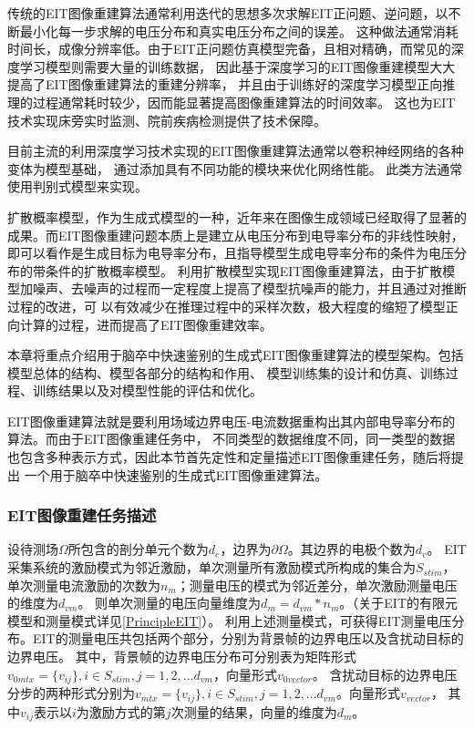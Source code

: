 
传统的EIT图像重建算法通常利用迭代的思想多次求解EIT正问题、逆问题，以不断最小化每一步求解的电压分布和真实电压分布之间的误差。
这种做法通常消耗时间长，成像分辨率低。由于EIT正问题仿真模型完备，且相对精确，而常见的深度学习模型则需要大量的训练数据，
因此基于深度学习的EIT图像重建模型大大提高了EIT图像重建算法的重建分辨率，
并且由于训练好的深度学习模型正向推理的过程通常耗时较少，因而能显著提高图像重建算法的时间效率。
这也为EIT技术实现床旁实时监测、院前疾病检测提供了技术保障。

目前主流的利用深度学习技术实现的EIT图像重建算法通常以卷积神经网络的各种变体为模型基础，
通过添加具有不同功能的模块来优化网络性能。
此类方法通常使用判别式模型来实现。

扩散概率模型，作为生成式模型的一种，近年来在图像生成领域已经取得了显著的成果。而EIT图像重建问题本质上是建立从电压分布到电导率分布的非线性映射，
即可以看作是生成目标为电导率分布，且指导模型生成电导率分布的条件为电压分布的带条件的扩散概率模型。
利用扩散模型实现EIT图像重建算法，由于扩散模型加噪声、去噪声的过程而一定程度上提高了模型抗噪声的能力，并且通过对推断过程的改进，可
以有效减少在推理过程中的采样次数，极大程度的缩短了模型正向计算的过程，进而提高了EIT图像重建效率。

本章将重点介绍用于脑卒中快速鉴别的生成式EIT图像重建算法的模型架构。包括模型总体的结构、模型各部分的结构和作用、
模型训练集的设计和仿真、训练过程、训练结果以及对模型性能的评估和优化。


\label{section:Model}

EIT图像重建算法就是要利用场域边界电压-电流数据重构出其内部电导率分布的算法。而由于EIT图像重建任务中，
不同类型的数据维度不同，同一类型的数据也包含多种表示方式，因此本节首先定性和定量描述EIT图像重建任务，随后将提出
一个用于脑卒中快速鉴别的生成式EIT图像重建算法。

\subsubsection{EIT图像重建任务描述}

设待测场$\Omega$所包含的剖分单元个数为$d_e$，边界为$\partial \Omega$。其边界的电极个数为$d_v$。
EIT采集系统的激励模式为邻近激励，单次测量所有激励模式所构成的集合为$S_{stim}$，单次测量电流激励的次数为$n_m$；测量电压的模式为邻近差分，单次激励测量电压的维度为$d_{vm}$。
则单次测量的电压向量维度为$d_m = d_{vm} * n_m$。（关于EIT的有限元模型和测量模式详见\cref{PrincipleEIT}）。
利用上述测量模式，可获得EIT测量电压分布。EIT的测量电压共包括两个部分，分别为背景帧的边界电压以及含扰动目标的边界电压。
其中，背景帧的边界电压分布可分别表为矩阵形式$v_{0mtx} = \{v_{ij}\}, i \in S_{stim}, j =1,2,...d_{vm}$，向量形式$v_{0vector}$。
含扰动目标的边界电压分步的两种形式分别为$v_{mtx} = \{v_{ij}\}, i \in S_{stim}, j =1,2,...d_{vm}$。向量形式$v_{vector}$，
其中$v_{ij}$表示以$i$为激励方式的第$j$次测量的结果，向量的维度为$d_m$。

